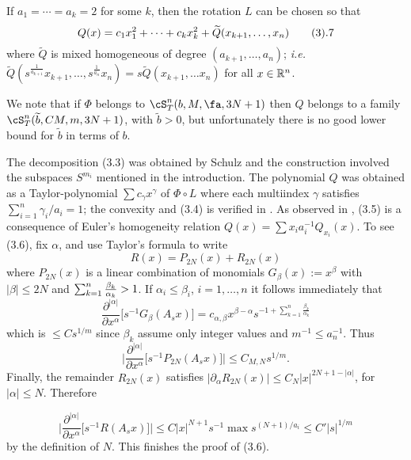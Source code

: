 If $a_1 = \cdots = a_k = 2$ for some $k$, then the rotation $L$ can be 
chosen so that
$$
Q(x) = c_1 x^2_1 + \cdots + c_k x^2_k + \widetilde Q
  (x_{k + 1}, \ldots , x_{n}) 
\tag  3.7
$$
where $\widetilde Q$ is mixed homogeneous of degree
 $(a_{k+1} , \ldots , a_{n})$; {\it i.e.}
$\widetilde Q(s^{\frac 1{a_{k+1}}}x_{k+1}, \dots, s^{\frac 1{a_n}}x_{n})=
s\widetilde Q(x_{k+1},\dots x_{n})$ for all $x\in \Bbb R^n$.
\endproclaim


We note that   if $\Phi$ belongs to 
$\cS_T^n(b,  M, \fa, 3N+1)$ then
 $Q$ belongs  to a  family
$\cS_T^n(\widetilde b, C M, m, 3N+1)$, with $\widetilde b>0$,
 but unfortunately
 there is no good  lower bound for 
$\widetilde b$ in 
terms of $b$.
\endremark


The decomposition (3.3) was obtained by Schulz \cite{20} and the
 construction involved the subspaces 
 $S^{m_i}$ mentioned 
in the introduction. 
The polynomial $Q$ was obtained as a Taylor-polynomial
$\sum c_\gamma x^\gamma$ of $\Phi\circ L$
 where each multiindex $\gamma$  satisfies
$\sum_{i=1}^{n}\gamma_i/a_i=1 $; the convexity and (3.4) is verified 
in \cite{20}.
As observed in \cite{14}, (3.5) is a consequence of Euler's homogeneity 
relation $Q(x)=\sum x_ia_i^{-1}Q_{x_i}(x)$.
To see (3.6), fix $\alpha$,
 and use Taylor's formula to
write 
$$R(x)=P_{2N}(x)+R_{2N}(x)
$$
where $P_{2N}(x)$ is a linear combination of monomials 
$G_\beta(x):=x^\beta$ with
$|\beta |\le 2N$ and $ \sum^{n}_{k=1}{\beta_k\over\alpha_k}>1$.
If $\alpha_i\le \beta_i$, $i=1,\dots,n$ it follows
immediately that
$$\frac{\partial^{|\alpha|}}{\partial x^\alpha}\Big[
s^{-1}G_\beta(A_sx)\Big]
=
c_{\alpha,\beta} x^{\beta-\alpha}
  s^{-1+\sum^{n}_{k=1}\frac{\beta_k}{\alpha_k}}
$$
which is $\le C s^{1/m}$ since $\beta_k$ assume only integer values and
$m^{-1}\le  a_n^{-1}$.
Thus
$$
\Big|
\frac{\partial^{|\alpha|}}{\partial x^\alpha}
\Big[
s^{-1}P_{2N}(A_s x)\Big]\Big|\le 
C_{M,N} s^{1/m}.
$$
  Finally, the remainder  $R_{2N}(x)$ satisfies $|\partial_\alpha R_{2N}(x)|\le
C_N|x|^{2N+1-|\alpha|}$, for $|\alpha|\le N$. Therefore

$$
\Big|\frac{\partial^{|\alpha|}}{\partial x^\alpha}\Big[
s^{-1}R(A_s x)\Big]\Big|
\le C|x|^{N+1} s^{-1}\max s^{(N+1)/a_i}\le C' |s|^{1/m}
$$
by the definition of $N$. This finishes the proof of (3.6).

